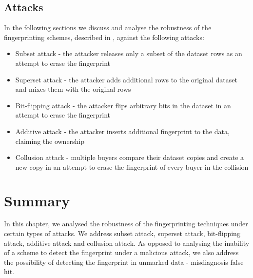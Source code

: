 \subsection{Attacks}
In the following sections we discuss and analyse the robustness of the fingerprinting schemes, described in , against the following attacks:
\begin{itemize}
    \item Subset attack - the attacker releases only a subset of the dataset rows as an attempt to erase the fingerprint
    \item Superset attack - the attacker adds additional rows to the original dataset and mixes them with the original rows
    \item Bit-flipping attack - the attacker flips arbitrary bits in the dataset in an attempt to erase the fingerprint
    \item Additive attack - the attacker inserts additional fingerprint to the data, claiming the ownership
    \item Collusion attack - multiple buyers compare their dataset copies and create a new copy in an attempt to erase the fingerprint of every buyer in the collision
\end{itemize}













\section{Summary}
In this chapter, we analysed the robustness of the fingerprinting techniques under certain types of attacks. We address subset attack, superset attack, bit-flipping attack, additive attack and collusion attack. 
As opposed to analysing the inability of a scheme to detect the fingerprint under a malicious attack, we also address the possibility of detecting the fingerprint in unmarked data - misdiagnosis false hit.

